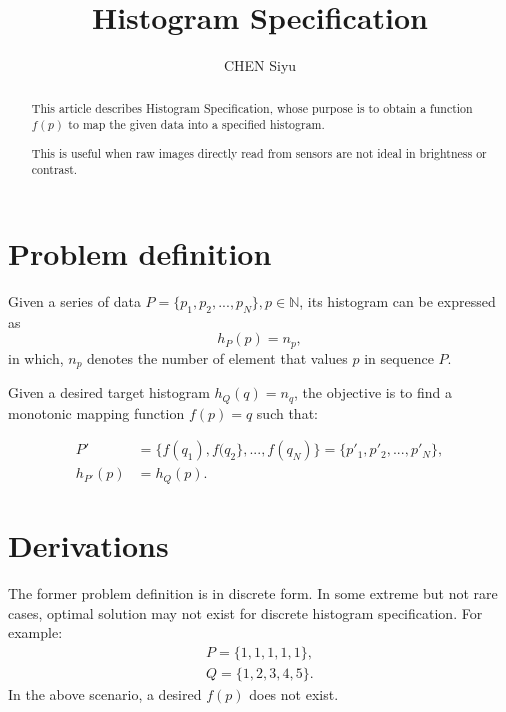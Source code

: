 \documentclass[12pt]{article}
\title{Histogram Specification}
\author{CHEN Siyu}
\begin{document}
\maketitle




\begin{abstract}
This article describes Histogram Specification, whose purpose is to obtain a function $f(p)$ to map the given data into a specified histogram.

This is useful when raw images directly read from sensors are not ideal in brightness or contrast.
\end{abstract}


\section{Problem definition}

Given a series of data $P=\{p_1,p_2,...,p_N\}, p \in \mathbb{N}$, its histogram can be expressed as 
\begin{equation}
h_P(p)=n_p,
\end{equation}
in which, $n_p$ denotes the number of element that values $p$ in sequence $P$.

Given a desired target histogram $h_Q(q) = n_q$, the objective is to find a monotonic mapping function $f(p) = q$ such that:

\begin{align}
P'&= \{f(q_1),f(q_2\},...,f(q_N) \} = \{p'_1,p'_2,...,p'_N\}, \\
h_{P'}(p) &=h_{Q}(p). 
\end{align}

\section{Derivations}
The former problem definition is in discrete form. In some extreme but not rare cases, optimal solution may not exist for discrete histogram specification. For example:
\begin{align}
P=\{1,1,1,1,1\}, \\ 
Q=\{1,2,3,4,5\}.
\end{align}
In the above scenario, a desired $f(p)$ does not exist.
\end{document}

